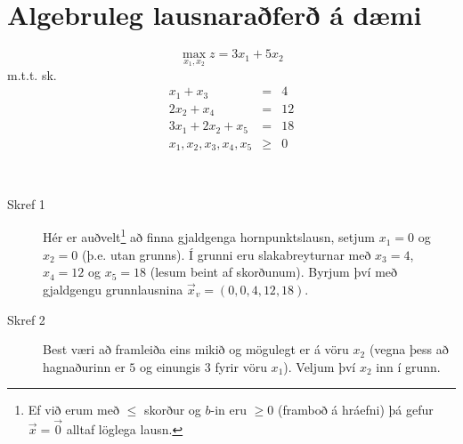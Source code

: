 \section{Algebruleg lausnaraðferð á dæmi}
\begin{daemi}
$$ \max_{x_1,x_2}  z = 3x_1 + 5 x_2 $$
m.t.t. sk. 
\begin{eqnarray*}
 x_1 + x_3 & = &4 \\
 2x_2 + x_4 & = &12 \\
 3x_1 + 2x_2 + x_5 & = &18 \\
 x_1,x_2,x_3,x_4,x_5  &\ge& 0
\end{eqnarray*}
\end{daemi}
\begin{lausn}
\begin{verbatim}
 
\end{verbatim}

\begin{description}
\item[Skref 1] Hér er auðvelt\footnote{Ef við erum með $\le$ skorður og $b$-in eru $\ge 0$ (framboð á hráefni) þá gefur $\vec{x}=\vec{0}$ alltaf löglega lausn.} að finna gjaldgenga hornpunktslausn, setjum $x_1=0$ og $x_2=0$ (þ.e. utan grunns). Í grunni eru slakabreyturnar  með $x_3=4$, $x_4=12$ og $x_5=18$ (lesum beint af skorðunum). Byrjum því með gjaldgengu grunnlausnina $\vec{x}_v=(0,0,4,12,18)$.
 
 
\item[Skref 2] Best væri að framleiða eins mikið og mögulegt er á vöru $x_2$ (vegna þess að
  hagnaðurinn er $5$ og einungis $3$ fyrir vöru $x_1$). Veljum því $x_2$ inn í grunn.


\end{description}
\end{lausn}
